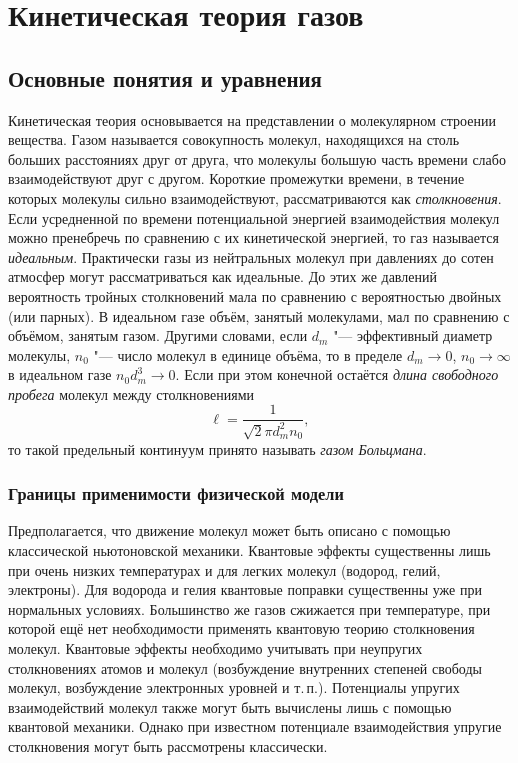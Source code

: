 \chapter{Кинетическая теория газов} \label{chapt:theory}

\section{Основные понятия и уравнения} \label{sect:fundamentals}

Кинетическая теория основывается на представлении о молекулярном строении вещества.
Газом называется совокупность молекул, находящихся на столь больших расстояниях друг от друга,
что молекулы большую часть времени слабо взаимодействуют друг с другом.
Короткие промежутки времени, в течение которых молекулы сильно взаимодействуют, рассматриваются как \emph{столкновения}.
Если усредненной по времени потенциальной энергией взаимодействия молекул можно пренебречь
по сравнению с их кинетической энергией, то газ называется \emph{идеальным}.
Практически газы из нейтральных молекул при давлениях до сотен атмосфер могут рассматриваться как идеальные.
До этих же давлений вероятность тройных столкновений мала по сравнению с вероятностью двойных (или парных).
В идеальном газе объём, занятый молекулами, мал по сравнению с объёмом, занятым газом.
Другими словами, если \(d_m\) "--- эффективный диаметр молекулы,
\(n_0\) "--- число молекул в единице объёма, то в пределе \(d_m\to0\), \(n_0\to\infty\)
в идеальном газе \(n_0 d_m^3\to0\).
Если при этом конечной остаётся \emph{длина свободного пробега} молекул между столкновениями
\begin{equation}\label{eq:ell}
    \ell = \frac1{\sqrt2\pi d_m^2 n_0},
\end{equation}
то такой предельный континуум принято называть \emph{газом Больцмана}.

\subsection{Границы применимости физической модели}

Предполагается, что движение молекул может быть описано с помощью классической ньютоновской механики.
Квантовые эффекты существенны лишь при очень низких температурах и для легких молекул (водород, гелий, электроны).
Для водорода и гелия квантовые поправки существенны уже при нормальных условиях.
Большинство же газов сжижается при температуре,
при которой ещё нет необходимости применять квантовую теорию столкновения молекул.
Квантовые эффекты необходимо учитывать при неупругих столкновениях атомов и молекул
(возбуждение внутренних степеней свободы молекул, возбуждение электронных уровней и т.\,п.).
Потенциалы упругих взаимодействий молекул также могут быть вычислены лишь с помощью квантовой механики.
Однако при известном потенциале взаимодействия упругие столкновения могут быть рассмотрены классически.

